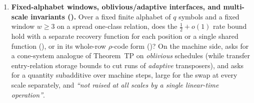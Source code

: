 \begin{enumerate}[label=\arabic*.]
  profiles (\cite[Problem~9.3]{SeventeenthPaper2026})? On the periodic variant of
  \cite[Problem~9.3]{SeventeenthPaper2026} ($d = 2^m$), when both $A_a$ and $B_a$ lie in the at most
  $(m + 1)2^m$-dimensional span of periodic Walsh digit masks composed with rotations
  (), is $\dim_F {}$$(A, B) \le (1 - c)d^2$
  for a constant $c > 0$?
\item \textbf{Fixed-alphabet windows, oblivious/adaptive interfaces, and multi-scale invariants (\cite[Problems~9.4 and~9.5]{SeventeenthPaper2026}).}
  Over a fixed finite alphabet of $q$ symbols and a fixed window $w \ge 3$ on a spread one-class
  relation, does the $\frac{1}{2} + o(1)$ rate bound hold with a separate recovery function for each
  position or a single shared function (\cite[Problem~9.4(b)]{SeventeenthPaper2026}), or in its
  whole-row $\rho$-code form (\cite[Problem~9.4(c)]{SeventeenthPaper2026})? On the machine side,
  \cite[Problem~9.4(a)]{SeventeenthPaper2026} asks for a cone-system analogue of Theorem~TP on
  \emph{oblivious} schedules (while \cite[Theorem~H.5 and Corollary~H.6]{AdaptiveTransfer2026} transfer
  entry-relation storage bounds to cut runs of \emph{adaptive} transposers), and
  \cite[Problem~9.5]{SeventeenthPaper2026} asks for a quantity subadditive over machine steps, large for
  the swap at every scale separately, and \emph{``not raised at all scales by a single linear-time
  operation''}.
\end{enumerate}
